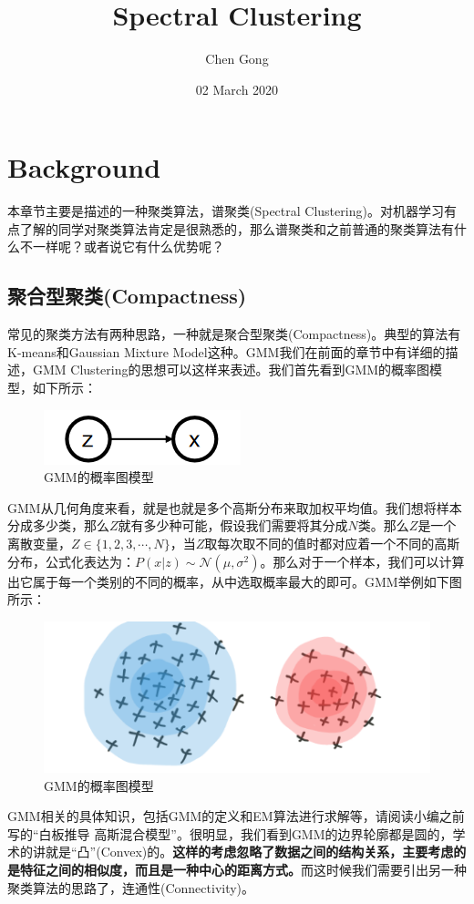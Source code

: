 \documentclass[a4paper]{article}
\title{Spectral Clustering}
\author{Chen Gong}
\date{02 March 2020}
\begin{document}
\maketitle
\tableofcontents
\newpage
\setcounter{page}{1} %
\clearpage

\section{Background}
本章节主要是描述的一种聚类算法，谱聚类(Spectral Clustering)。对机器学习有点了解的同学对聚类算法肯定是很熟悉的，那么谱聚类和之前普通的聚类算法有什么不一样呢？或者说它有什么优势呢？

\subsection{聚合型聚类(Compactness)}
常见的聚类方法有两种思路，一种就是聚合型聚类(Compactness)。典型的算法有K-means和Gaussian Mixture Model这种。GMM我们在前面的章节中有详细的描述，GMM Clustering的思想可以这样来表述。我们首先看到GMM的概率图模型，如下所示：
\begin{figure}[H]
    \centering
    \includegraphics[width=.25\textwidth]{微信图片_20200302213857.png}
    \caption{GMM的概率图模型}
\end{figure}
GMM从几何角度来看，就是也就是多个高斯分布来取加权平均值。我们想将样本分成多少类，那么$Z$就有多少种可能，假设我们需要将其分成$N$类。那么$Z$是一个离散变量，$Z\in \{1,2,3,\cdots,N\}$，当$Z$取每次取不同的值时都对应着一个不同的高斯分布，公式化表达为：$P(x|z)\sim \mathcal{N}(\mu,\sigma^2)$。那么对于一个样本，我们可以计算出它属于每一个类别的不同的概率，从中选取概率最大的即可。GMM举例如下图所示：
\begin{figure}[H]
    \centering
    \includegraphics[width=.45\textwidth]{微信图片_20200302215950.png}
    \caption{GMM的概率图模型}
\end{figure}
GMM相关的具体知识，包括GMM的定义和EM算法进行求解等，请阅读小编之前写的“白板推导 高斯混合模型”。很明显，我们看到GMM的边界轮廓都是圆的，学术的讲就是“凸”(Convex)的。\textbf{这样的考虑忽略了数据之间的结构关系，主要考虑的是特征之间的相似度，而且是一种中心的距离方式。}而这时候我们需要引出另一种聚类算法的思路了，连通性(Connectivity)。
\end{document}
